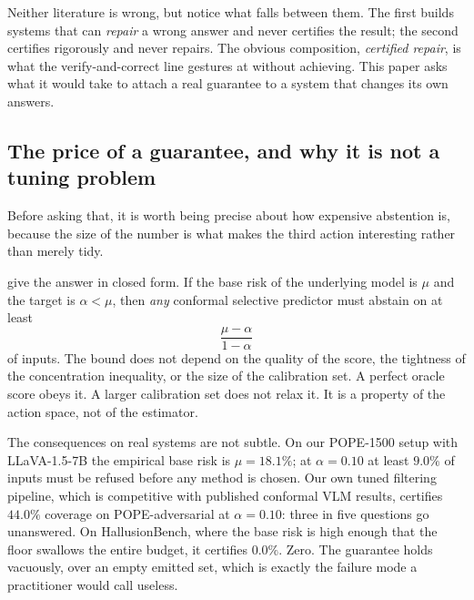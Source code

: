\documentclass{article}
\theoremstyle{plain}
\theoremstyle{definition}
\theoremstyle{remark}
\begin{document}
Neither literature is wrong, but notice what falls between them. The first builds systems
that can \emph{repair} a wrong answer and never certifies the result; the second certifies
rigorously and never repairs. The obvious composition, \emph{certified repair}, is what the
verify-and-correct line \citep{woodpecker,lure,cmvkgguard} gestures at without achieving.
This paper asks what it would take to attach a real guarantee to a system that changes its
own answers.

\subsection{The price of a guarantee, and why it is not a tuning problem}

Before asking that, it is worth being precise about how expensive abstention is, because
the size of the number is what makes the third action interesting rather than merely
tidy.

\citet{crcimposs} give the answer in closed form. If the base risk of the underlying model
is $\mu$ and the target is $\alpha<\mu$, then \emph{any} conformal selective predictor must
abstain on at least
\[
  \frac{\mu-\alpha}{1-\alpha}
\]
of inputs. The bound does not depend on the quality of the score, the
tightness of the concentration inequality, or the size of the calibration set. A perfect
oracle score obeys it. A larger calibration set does not relax it. It is a property of the
action space, not of the estimator.

The consequences on real systems are not subtle. On our POPE-1500 setup with LLaVA-1.5-7B
the empirical base risk is $\mu=18.1\%$; at $\alpha=0.10$ at least $9.0\%$ of inputs must be
refused before any method is chosen. Our own tuned filtering pipeline, which is competitive
with published conformal VLM results, certifies $44.0\%$ coverage on POPE-adversarial at
$\alpha=0.10$: three in five questions go unanswered. On HallusionBench, where the base risk
is high enough that the floor swallows the entire budget, it certifies $0.0\%$. Zero. The
guarantee holds vacuously, over an empty emitted set, which is exactly the failure mode a
practitioner would call useless.
\end{document}
